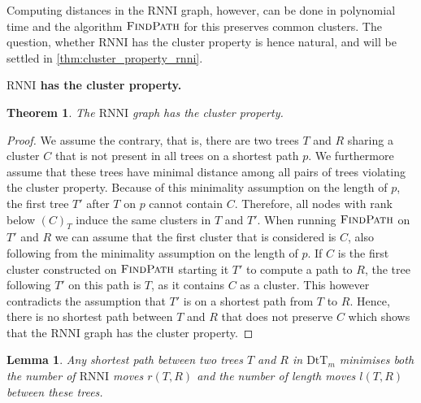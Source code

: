 \documentclass[11pt]{amsart}
\newtheorem{theorem}{Theorem}
\newtheorem{lemma}{Lemma}
\newcommand{\rnni}{\mathrm{RNNI}}
\newcommand{\findpath}{\textsc{FindPath}}
\newcommand{\dtt}{\mathrm{DtT}}
\newcommand{\summary}[1]{\textbf{#1}} %
\begin{document}
Computing distances in the $\rnni$ graph, however, can be done in polynomial time and the algorithm $\findpath$ for this \autocite{Collienne2020-iu} preserves common clusters.
The question, whether $\rnni$ has the cluster property is hence natural, and will be settled in \autoref{thm:cluster_property_rnni}.

\summary{$\rnni$ has the cluster property.}
\begin{theorem}
	The $\rnni$ graph has the cluster property.
	\label{thm:cluster_property_rnni}
\end{theorem}

\begin{proof}
	We assume the contrary, that is, there are two trees $T$ and $R$ sharing a cluster $C$ that is not present in all trees on a shortest path $p$.
	We furthermore assume that these trees have minimal distance among all pairs of trees violating the cluster property.
	Because of this minimality assumption on the length of $p$, the first tree $T'$ after $T$ on $p$ cannot contain $C$.
	Therefore, all nodes with rank below $(C)_T$ induce the same clusters in $T$ and $T'$.
	When running $\findpath$ on $T'$ and $R$ we can assume that the first cluster that is considered is $C$, also following from the minimality assumption on the length of $p$.
	If $C$ is the first cluster constructed on $\findpath$ starting it $T'$ to compute a path to $R$, the tree following $T'$ on this path is $T$, as it contains $C$ as a cluster.
	This however contradicts the assumption that $T'$ is on a shortest path from $T$ to $R$.
	Hence, there is no shortest path between $T$ and $R$ that does not preserve $C$ which shows that the $\rnni$ graph has the cluster property.
\end{proof}


\begin{lemma}
	Any shortest path between two trees $T$ and $R$ in $\dtt_m$ minimises both the number of $\rnni$ moves $r(T,R)$ and the number of length moves $l(T,R)$ between these trees.
	\label{lemma:dtt_path_sum}
\end{lemma}
\end{document}
